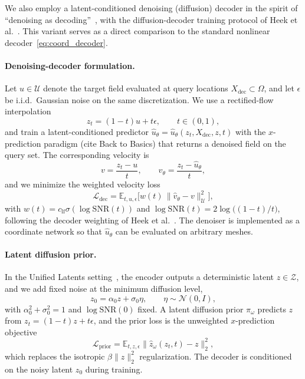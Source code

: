 \documentclass[review,onefignum,onetabnum]{siamart250211}
\newcommand{\E}{\mathbb{E}}
\newcommand{\1}{\mathbf{1}}
\newcommand{\cU}{\mathcal{U}}
\newcommand{\cZ}{\mathcal{Z}}
\begin{document}
We also employ a latent-conditioned denoising (diffusion) decoder in the spirit of ``denoising as decoding''~\cite{zhao2025epsilonvae}, with the diffusion-decoder training protocol of Heek et al.~\cite{heek2026ul}.
This variant serves as a direct comparison to the standard nonlinear decoder~\eqref{eq:coord_decoder}.

\paragraph{Denoising-decoder formulation.}
Let $u\in\cU$ denote the target field evaluated at query locations $X_{\mathrm{dec}}\subset\Omega$, and let $\epsilon$ be i.i.d.\ Gaussian noise on the same discretization. We use a rectified-flow interpolation
\begin{equation}
z_t=(1-t)u+t\epsilon,\qquad t\in(0,1),
\label{eq:rf_mixture}
\end{equation}
and train a latent-conditioned predictor $\hat u_\theta=\hat u_\theta(z_t,X_{\mathrm{dec}},z,t)$ with the $x$-prediction paradigm (cite Back to Basics) that returns a denoised field on the query set. The corresponding velocity is
\begin{equation}
v=\frac{z_t-u}{t},\qquad \hat v_\theta=\frac{z_t-\hat u_\theta}{t},
\label{eq:rf_velocity}
\end{equation}
and we minimize the weighted velocity loss
\begin{equation}
\mathcal{L}_{\mathrm{dec}}
=\E_{t,u,\epsilon}\bigl[w(t)\,\|\hat v_\theta-v\|_{\cU}^2\bigr],
\label{eq:denoiser_loss}
\end{equation}
with $w(t)=c_{\mathrm{lf}}\sigma(\log\mathrm{SNR}(t))$ and $\log\mathrm{SNR}(t)=2\log\!\bigl((1-t)/t\bigr)$, following the decoder weighting of Heek et al.~\cite{heek2026ul}. The denoiser is implemented as a coordinate network so that $\hat u_\theta$ can be evaluated on arbitrary meshes.

\paragraph{Latent diffusion prior.}
In the Unified Latents setting~\cite{heek2026ul}, the encoder outputs a deterministic latent $z \in \cZ$, and we add fixed noise at the minimum diffusion level,
\begin{equation}
z_0=\alpha_0 z+\sigma_0\eta,\qquad \eta\sim\mathcal{N}(0,I),
\label{eq:latent_noise}
\end{equation}
with $\alpha_0^2+\sigma_0^2=1$ and $\log\mathrm{SNR}(0)$ fixed. A latent diffusion prior $\pi_\omega$ predicts $z$ from $z_t=(1-t)z+t\epsilon$, and the prior loss is the unweighted $x$-prediction objective
\begin{equation}
\mathcal{L}_{\mathrm{prior}}=\E_{t,z,\epsilon}\| \hat z_\omega(z_t,t)-z\|_2^2,
\label{eq:prior_loss}
\end{equation}
which replaces the isotropic $\beta\|z\|_2^2$ regularization. The decoder is conditioned on the noisy latent $z_0$ during training.
\end{document}
